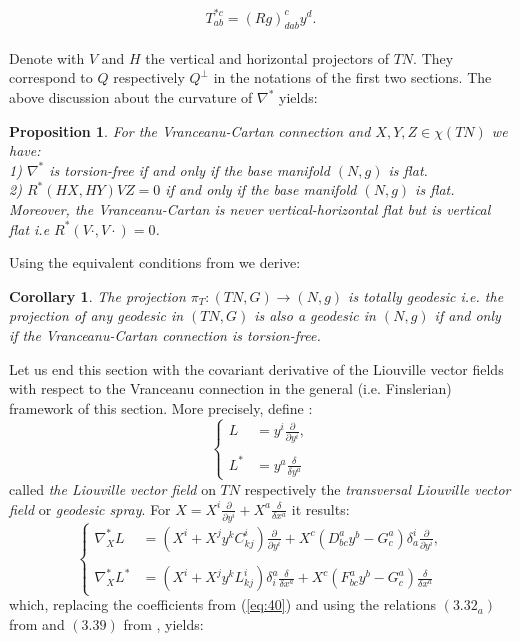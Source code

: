 \documentclass[11pt,oneside,english]{amsart}
\numberwithin{equation}{section}
\numberwithin{figure}{section}
\theoremstyle{plain}
\theoremstyle{definition}
\theoremstyle{definition}
\theoremstyle{plain}
\newtheorem{prop}[thm]{Proposition}
\theoremstyle{plain}
\newtheorem{cor}[thm]{Corollary}
\theoremstyle{remark}
\theoremstyle{remark}
\begin{document}
\[
T_{ab}^{*c}=(Rg)_{dab}^{c}y^{d}.\]
\\

Denote with $V$ and $H$ the vertical and horizontal projectors of
$TN.$ They correspond to $Q$ respectively $Q^{\bot}$ in the notations
of the first two sections. The above discussion about the curvature
of $\nabla^{*}$ yields:

\medskip{}

\begin{prop}
For the Vranceanu-Cartan connection and $X,Y,Z\in\chi(TN)$ we have:
\\
 1) $\nabla^{*}$ is torsion-free if and only if the base manifold
$(N,g)$ is flat.\\
 2) $R^{*}(HX,HY)VZ=0$ if and only if the base manifold $(N,g)$
is flat.\\
 Moreover, the Vranceanu-Cartan is never vertical-horizontal flat
but is vertical flat i.e $R^{*}(V\cdot,V\cdot)=0$.
\end{prop}
\medskip{}

Using the equivalent conditions from \cite[p. 237]{a:t} we derive:

\medskip{}

\begin{cor}
The projection $\pi_{T}:(TN,G)\rightarrow(N,g)$ is totally geodesic
i.e. the projection of any geodesic in $(TN,G)$ is also a geodesic
in $(N,g)$ if and only if the Vranceanu-Cartan connection is torsion-free.
\end{cor}
\medskip{}

Let us end this section with the covariant derivative of the Liouville
vector fields with respect to the Vranceanu connection in the general
(i.e. Finslerian) framework of this section. More precisely, define
\cite[p. 231]{b:f}: \begin{equation}
\left\{ \begin{array}{ll}
L & =y^{i}\frac{\partial}{\partial y^{i}},\\
\\L^{*} & =y^{a}\frac{\delta}{\delta y^{a}}\end{array}\right.\label{eq:51}\end{equation}
 called \textit{the Liouville vector field} on $TN$ respectively
the \textit{transversal Liouville vector field} or \textit{geodesic
spray}. For $X=X^{i}\frac{\partial}{\partial y^{i}}+X^{a}\frac{\delta}{\delta x^{a}}$
it results: \begin{equation}
\left\{ \begin{array}{ll}
\nabla_{X}^{*}L & =(X^{i}+X^{j}y^{k}C_{kj}^{i})\frac{\partial}{\partial y^{i}}+X^{c}(D_{bc}^{a}y^{b}-G_{c}^{a})\delta_{a}^{i}\frac{\partial}{\partial y^{i}},\\
\\\nabla_{X}^{*}L^{*} & =(X^{i}+X^{j}y^{k}L_{kj}^{i})\delta_{i}^{a}\frac{\delta}{\delta x^{a}}+X^{c}(F_{bc}^{a}y^{b}-G_{c}^{a})\frac{\delta}{\delta x^{a}}\end{array}\right.\label{eq:52}\end{equation}
 which, replacing the coefficients from (\ref{eq:40}) and using the
relations $(3.32_{a})$ from \cite[p. 231]{b:f} and $(3.39)$ from
\cite[p. 232]{b:f}, yields:
\end{document}
